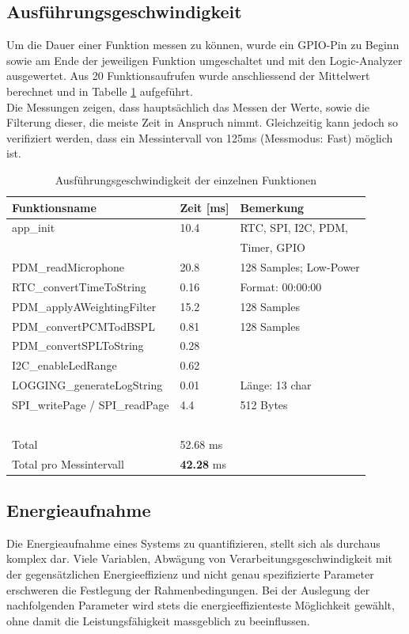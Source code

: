 \documentclass[12pt]{article}
\begin{document}
	\subsection{Ausführungsgeschwindigkeit}
	Um die Dauer einer Funktion messen zu können, wurde ein GPIO-Pin zu Beginn sowie am Ende der jeweiligen Funktion umgeschaltet und mit den Logic-Analyzer ausgewertet. Aus 20 Funktionsaufrufen wurde anschliessend der Mittelwert berechnet und in Tabelle \ref{tab:ausfuehrungsgeschwindigkeit} aufgeführt. \\
	Die Messungen zeigen, dass hauptsächlich das Messen der Werte, sowie die Filterung dieser, die meiste Zeit in Anspruch nimmt. Gleichzeitig kann jedoch so verifiziert werden, dass ein Messintervall von 125ms (Messmodus: Fast) möglich ist.
	\begin{table}[H]
		\centering
		\begin{tabular}{|l|l|l|}
			\hline
			\textbf{Funktionsname} & \textbf{Zeit [ms]} & \textbf{Bemerkung} \\ \hline
			app\_init & 10.4 & RTC, SPI, I2C, PDM, \\ 
			 ~ & ~ & Timer, GPIO \\ 
			 \hline
			PDM\_readMicrophone & 20.8 & 128 Samples; Low-Power \\ \hline
			RTC\_convertTimeToString & 0.16 & Format: 00:00:00 \\ \hline
			PDM\_applyAWeightingFilter & 15.2 & 128 Samples \\ \hline
			PDM\_convertPCMTodBSPL & 0.81 & 128 Samples \\ \hline
			PDM\_convertSPLToString & 0.28 & ~ \\ \hline
			I2C\_enableLedRange & 0.62 & ~ \\ \hline
			LOGGING\_generateLogString & 0.01 & Länge: 13 char \\ \hline
			SPI\_writePage / SPI\_readPage & 4.4 & 512 Bytes \\ \hline
			~ & ~ & ~ \\ \hline
			Total & 52.68 ms & ~ \\ \hline
			Total pro Messintervall & \textbf{42.28} ms & ~ \\ \hline
		\end{tabular}
		\caption{Ausführungsgeschwindigkeit der einzelnen Funktionen}
		\label{tab:ausfuehrungsgeschwindigkeit}
	\end{table}
	\subsection{Energieaufnahme}
	Die Energieaufnahme eines Systems zu quantifizieren, stellt sich als durchaus komplex dar. Viele Variablen, Abwägung von Verarbeitungsgeschwindigkeit mit der gegensätzlichen Energieeffizienz und nicht genau spezifizierte Parameter erschweren die Festlegung der Rahmenbedingungen. Bei der Auslegung der nachfolgenden Parameter wird stets die energieeffizienteste Möglichkeit gewählt, ohne damit die Leistungsfähigkeit massgeblich zu beeinflussen.
\end{document}
